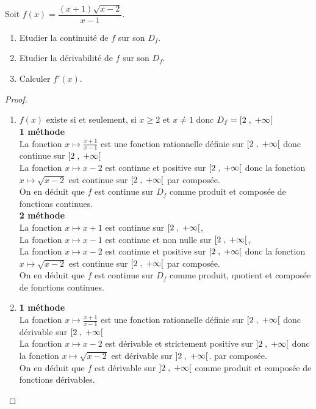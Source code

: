 \begin{exercice}
Soit $ f (x)=\dfrac{(x+1)\sqrt{x-2}}{x-1}.$
 \begin{enumerate}
\item Etudier la continuité  de $ f $ sur son $D_{f}$.
\item Etudier  la dérivabilité de $ f $ sur son $D_{f}$.
\item Calculer $ f'(x). $
\end{enumerate}
\end{exercice}
\begin{proof}
\begin{enumerate}
\item $ f(x) $ existe si et seulement, si $ x \geq 2 $ et  $ x\neq 1 $ donc $ D_{f}=\left[2 \;,\; +\infty\right[ $ \\ \textbf{ 1\iere{} méthode } \\ La fonction $ x \mapsto \frac{x+1}{x-1} $ est une fonction rationnelle définie sur $\left[2 \;,\; +\infty\right[  $ donc continue  sur $\left[2 \;,\; +\infty\right[  $ \\ La fonction $ x \mapsto x-2$ est continue et positive sur $\left[2 \;,\; +\infty\right[  $  donc la fonction $ x \mapsto \sqrt{x-2} $ est continue sur $\left[2 \;,\; +\infty\right[  $  par composée.\\ On en déduit que $ f $ est continue sur $  D_{f}$ comme produit et composée de  fonctions continues. \\
\textbf{ 2\iere{} méthode } \\  La fonction $ x \mapsto x+1 $ est  continue  sur $\left[2 \;,\; +\infty\right[ $, \\ La fonction $ x \mapsto x-1 $ est  continue et non nulle  sur  $\left[2 \;,\; +\infty\right[ $,   \\ La fonction $ x \mapsto x-2$ est continue et positive sur $\left[2 \;,\; +\infty\right[$  donc la fonction $ x \mapsto \sqrt{x-2} $ est continue sur $\left[2 \;,\; +\infty\right[ $  par composée.\\ On en déduit que $ f $ est continue sur $  D_{f}$ comme produit, quotient et composée de  fonctions continues.\\

\item  \textbf{ 1\iere{} méthode } \\ La fonction $ x \mapsto \frac{x+1}{x-1} $ est une fonction rationnelle définie sur $\left[2 \;,\; +\infty\right[  $ donc  dérivable sur $\left[2 \;,\; +\infty\right[  $ \\ La fonction $ x \mapsto x-2$ est dérivable et strictement positive sur $\left]2 \;,\; +\infty\right[$ donc la fonction $ x \mapsto \sqrt{x-2} $ est  dérivable sur $\left]2 \;,\; +\infty\right[$. par composée.\\ On en déduit que $ f $ est dérivable  sur $\left]2 \;,\; +\infty\right[$ comme produit et composée de  fonctions dérivables. \\


\end{enumerate}
\end{proof}
